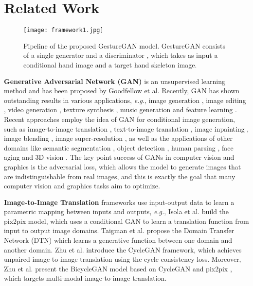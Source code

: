 \documentclass[sigconf]{acmart}
\begin{document}
\section{Related Work}
\label{sec:relatewprk}

\begin{figure*}[!t] \tiny
	\centering
\texttt{[image: framework1.jpg]}
	\caption{Pipeline of the proposed GestureGAN model. GestureGAN consists of a single generator  and a discriminator , which takes as input a conditional hand image and a target hand skeleton image. 
	}
	\label{fig:framework}
\end{figure*}

\noindent\textbf{Generative Adversarial Network (GAN)} \cite{goodfellow2014generative} is an unsupervised learning method and has been proposed by Goodfellow et al.
Recently, GAN has shown outstanding results in various applications, \textit{e.g.}, image generation \cite{karras2017progressive,berthelot2017began}, image editing \cite{shu2017neural,perarnau2016invertible}, video generation \cite{tulyakov2017mocogan,mathieu2015deep}, texture synthesis \cite{li2016precomputed}, music generation \cite{yang2017midinet} and feature learning \cite{xie2017controllable}.
Recent approaches employ the idea of GAN for conditional image generation, such as image-to-image translation \cite{isola2017image,wang2018high}, text-to-image translation \cite{reed2016generative,han2017stackgan}, image inpainting \cite{li2017generative,dolhansky2017eye},
image blending \cite{wu2017gp},  image super-resolution \cite{ledig2016photo}, as well as the applications of other domains like semantic segmentation \cite{luc2016semantic}, object detection \cite{li2017perceptual,wang2017fast}, human parsing \cite{liu2018cross}, face aging \cite{liu2017face} and 3D vision \cite{park2017transformation,wu2016learning}.
The key point success of GANs in computer vision and graphics is the adversarial loss, which allows the model to generate images that are  indistinguishable from real images, and this is exactly the goal that many computer vision and graphics tasks aim to optimize.

\noindent\textbf{Image-to-Image Translation} frameworks use input-output data to learn a parametric mapping between inputs and outputs, \textit{e.g.}, Isola et al. \cite{isola2017image} build the pix2pix model, which uses a conditional GAN to learn a translation function from input to output image domains.
Taigman et al. \cite{taigman2016unsupervised} propose the Domain Transfer Network (DTN) which learns a generative function between one domain and another domain.
Zhu et al. \cite{zhu2017unpaired} introduce the CycleGAN framework, which achieves unpaired image-to-image translation using the cycle-consistency loss.
Moreover, Zhu et al. \cite{zhu2017toward} present the BicycleGAN model based on CycleGAN \cite{zhu2017unpaired} and pix2pix \cite{isola2017image}, which targets multi-modal image-to-image translation.
\end{document}
